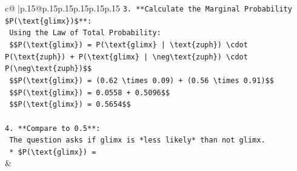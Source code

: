 \documentclass{article}
\begin{document}
{\begin{supertabular}{c@{$\;$}|p{.15\linewidth}@{}p{.15\linewidth}p{.15\linewidth}p{.15\linewidth}p{.15\linewidth}p{.15\linewidth}}
{{{\texttt{3.  **Calculate the Marginal Probability \$P(\textbackslash{}text\{glimx\})\$**:} \\
\texttt{    Using the Law of Total Probability:} \\
\texttt{    \$\$P(\textbackslash{}text\{glimx\}) = P(\textbackslash{}text\{glimx\} | \textbackslash{}text\{zuph\}) \textbackslash{}cdot P(\textbackslash{}text\{zuph\}) + P(\textbackslash{}text\{glimx\} | \textbackslash{}neg\textbackslash{}text\{zuph\}) \textbackslash{}cdot P(\textbackslash{}neg\textbackslash{}text\{zuph\})\$\$} \\
\texttt{    \$\$P(\textbackslash{}text\{glimx\}) = (0.62 \textbackslash{}times 0.09) + (0.56 \textbackslash{}times 0.91)\$\$} \\
\texttt{    \$\$P(\textbackslash{}text\{glimx\}) = 0.0558 + 0.5096\$\$} \\
\texttt{    \$\$P(\textbackslash{}text\{glimx\}) = 0.5654\$\$} \\
\\ 
\texttt{4.  **Compare to 0.5**:} \\
\texttt{    The question asks if glimx is *less likely* than not glimx.} \\
\texttt{    *   \$P(\textbackslash{}text\{glimx\}) =} \\
            }
        }
    }
    & \\ \\


\end{supertabular}}
\end{document}
